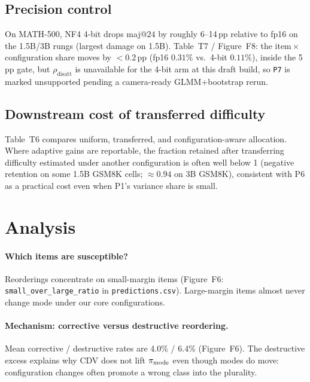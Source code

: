 \subsection{Precision control}
On MATH-500, NF4 4-bit drops maj@$24$ by roughly 6--14\,pp relative to fp16 on
the 1.5B/3B rungs (largest damage on 1.5B). Table~T7 / Figure~F8: the
item\,$\times$\,configuration share moves by ${<}0.2$\,pp (fp16 $0.31\%$ vs.\
4-bit $0.11\%$), inside the 5\,pp gate, but $\rho_{\mathrm{disatt}}$ is
unavailable for the 4-bit arm at this draft build, so \texttt{P7} is marked
unsupported pending a camera-ready GLMM+bootstrap rerun.

\subsection{Downstream cost of transferred difficulty}
Table~T6 compares uniform, transferred, and configuration-aware allocation.
Where adaptive gains are reportable, the fraction retained after transferring
difficulty estimated under another configuration is often well below 1
(negative retention on some 1.5B GSM8K cells; $\approx 0.94$ on 3B GSM8K),
consistent with P6 as a practical cost even when P1's variance share is small.

\section{Analysis}
\label{sec:analysis}

\paragraph{Which items are susceptible?}
Reorderings concentrate on small-margin items (Figure~F6:
\texttt{small\_over\_large\_ratio} in \texttt{predictions.csv}). Large-margin
items almost never change mode under our core configurations.

\paragraph{Mechanism: corrective versus destructive reordering.}
Mean corrective / destructive rates are 4.0\% / 6.4\% (Figure~F6). The
destructive excess explains why CDV does not lift $\pi_{\mathrm{mode}}$ even though modes
do move: configuration changes often promote a wrong class into the plurality.

